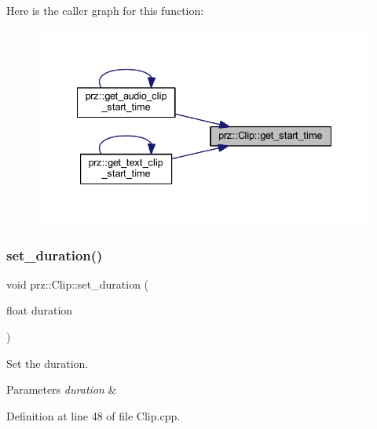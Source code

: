 Here is the caller graph for this function\+:
\nopagebreak
\begin{figure}[H]
\begin{center}
\leavevmode
\includegraphics[width=335pt]{classprz_1_1_clip_a65df9388088c8a607e90b73506550cd5_icgraph}
\end{center}
\end{figure}
\mbox{\label{classprz_1_1_clip_a7555fe34e45f6032ea282ca6d605ace6}} 
\subsubsection{\texorpdfstring{set\_duration()}{set\_duration()}}
{\footnotesize\ttfamily void prz\+::\+Clip\+::set\+\_\+duration (\begin{DoxyParamCaption}\item[{float}]{duration }\end{DoxyParamCaption})}



Set the duration. 


\begin{DoxyParams}{Parameters}
{\em duration} & \\
\hline
\end{DoxyParams}


Definition at line 48 of file Clip.\+cpp.

